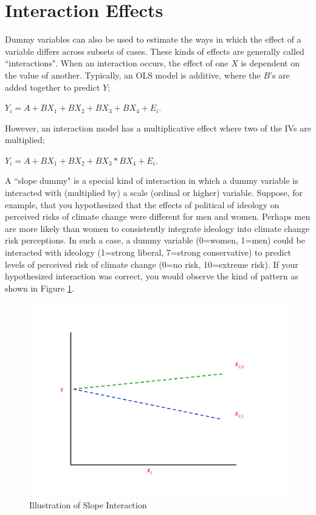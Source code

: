 \documentclass[11pt,openany]{book}\usepackage[]{graphicx}\usepackage[]{color}
\begin{document}
{\section{Interaction Effects}

Dummy variables can also be used to estimate the ways in which the effect of a variable differs across subsets of cases. These kinds of effects are generally called ``interactions".  When an interaction occurs, the effect of one $X$ is dependent on the value of another. Typically, an OLS model is additive, where the $B$'s are added together to predict $Y$; 

  $Y_i = A + BX_1 + BX_2 + BX_3 + BX_4 + E_i$. 
  
However, an interaction model has a multiplicative effect where two of the IVs are multiplied;

  $Y_i = A + BX_1 + BX_2 + BX_3 * BX_4 + E_i$. 

A ``slope dummy" is a special kind of interaction in which a dummy variable  is interacted with (multiplied by) a scale (ordinal or higher) variable. Suppose, for example, that you hypothesized that the effects of political of ideology on perceived risks of climate change were different for men and women. Perhaps men are more likely than women to consistently integrate ideology into climate change risk perceptions. In such a case, a dummy variable (0=women, 1=men) could be interacted with ideology (1=strong liberal, 7=strong conservative) to predict levels of perceived risk of climate change (0=no risk, 10=extreme risk).  If your hypothesized interaction was correct, you would observe the kind of pattern as shown in Figure \ref{fig:dumin}. 

\begin{figure}
  \centering
  \includegraphics[width=5in]{14_Topics/duminter.pdf}
  \caption {Illustration of Slope Interaction \label{fig:dumin}}
\end{figure}

}
\end{document}
